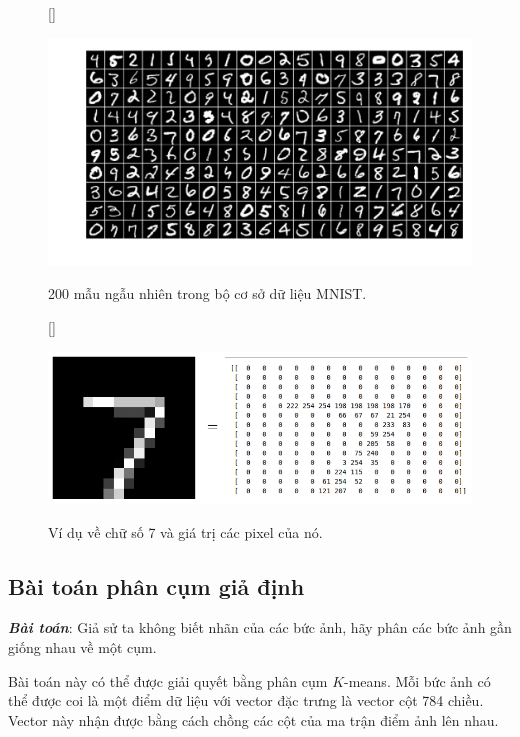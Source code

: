 \begin{figure}[t]
[\FBwidth]
{\caption{
200 mẫu ngẫu nhiên trong bộ cơ sở dữ liệu MNIST.
}
\label{fig:5_mnist}}
{ %
\includegraphics[width=.75\textwidth]{ebookML_src/src/kmeans/mnist_ex.png}
}
\end{figure}
\begin{figure}[t]
[\FBwidth]
{\caption{
Ví dụ về chữ số 7 và giá trị các pixel của nó.
}
\label{fig:5_digit7}}
{ %
\includegraphics[width=.75\textwidth]{Chapters/03_SimpleML/4_kmeans/digit_7.png}
}
\end{figure}


\subsection{Bài toán phân cụm giả định}
\textit{\textbf{Bài toán}}: Giả sử ta không biết nhãn của các bức ảnh, hãy phân
các bức ảnh gần giống nhau về một cụm.

Bài toán này có thể được giải quyết bằng phân cụm $K$-means. Mỗi bức ảnh có thể
được coi là một điểm dữ liệu với vector đặc trưng là vector cột 784 chiều.
Vector này nhận được bằng cách chồng các cột của ma trận điểm ảnh lên nhau.


